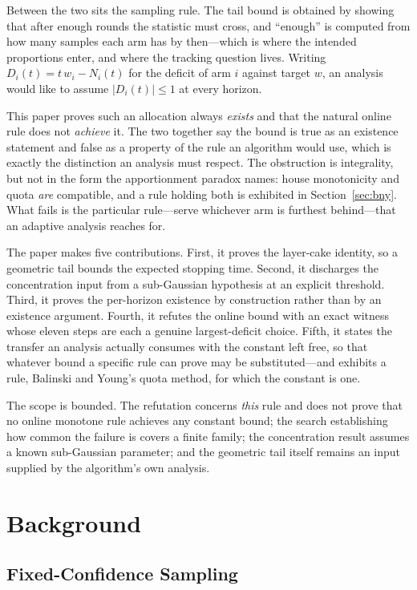 Between the two sits the sampling rule. The tail bound is obtained by showing that after
enough rounds the statistic must cross, and ``enough'' is computed from how many samples each
arm has by then---which is where the intended proportions enter, and where the tracking
question lives. Writing $D_{i}(t)=t\,w_{i}-N_{i}(t)$ for the deficit of arm $i$ against target
$w$, an analysis would like to assume $|D_{i}(t)|\le1$ at every horizon.

This paper proves such an allocation always \emph{exists} and that the natural online rule does
not \emph{achieve} it. The two together say the bound is true as an existence statement and
false as a property of the rule an algorithm would use, which is exactly the distinction an
analysis must respect. The obstruction is integrality, but not in the form the apportionment paradox names: house
monotonicity and quota \emph{are} compatible, and a rule holding both is exhibited in
Section~\ref{sec:bny}. What fails is the particular rule---serve whichever arm is furthest
behind---that an adaptive analysis reaches for.

The paper makes five contributions. First, it proves the layer-cake identity, so a geometric
tail bounds the expected stopping time. Second, it discharges the concentration input from a
sub-Gaussian hypothesis at an explicit threshold. Third, it proves the per-horizon existence
by construction rather than by an existence argument. Fourth, it refutes the online bound with
an exact witness whose eleven steps are each a genuine largest-deficit choice. Fifth, it
states the transfer an analysis actually consumes with the constant left free, so that
whatever bound a specific rule can prove may be substituted---and exhibits a rule, Balinski
and Young's quota method, for which the constant is one.

The scope is bounded. The refutation concerns \emph{this} rule and does not prove that no
online monotone rule achieves any constant bound; the search establishing how common the
failure is covers a finite family; the concentration result assumes a known sub-Gaussian
parameter; and the geometric tail itself remains an input supplied by the algorithm's own
analysis.

\section{Background}

\subsection{Fixed-Confidence Sampling}

